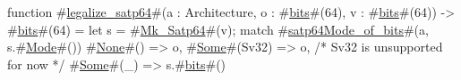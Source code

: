function #\hyperref[sailRISCVzlegalizzezysatp64]{legalize\_satp64}#(a : Architecture, o : #\hyperref[sailRISCVzbits]{bits}#(64), v : #\hyperref[sailRISCVzbits]{bits}#(64)) -> #\hyperref[sailRISCVzbits]{bits}#(64) = {
  let s = #\hyperref[sailRISCVzMkzySatp64]{Mk\_Satp64}#(v);
  match #\hyperref[sailRISCVzsatp64Modezyofzybits]{satp64Mode\_of\_bits}#(a, s.#\hyperref[sailRISCVzMode]{Mode}#()) {
    #\hyperref[sailRISCVzNone]{None}#()     => o,
    #\hyperref[sailRISCVzSome]{Some}#(Sv32) => o,  /* Sv32 is unsupported for now */
    #\hyperref[sailRISCVzSome]{Some}#(_)    => s.#\hyperref[sailRISCVzbits]{bits}#()
  }
}
